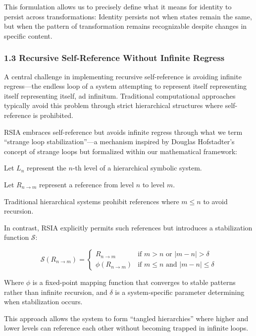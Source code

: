 \documentclass[12pt]{article}
\begin{document}
This formulation allows us to precisely define what it means for
identity to persist across transformations: Identity persists not when
states remain the same, but when the pattern of transformation remains
recognizable despite changes in specific content.

\subsubsection{1.3 Recursive Self-Reference Without Infinite
Regress}\label{recursive-self-reference-without-infinite-regress}

A central challenge in implementing recursive self-reference is avoiding
infinite regress---the endless loop of a system attempting to represent
itself representing itself representing itself, ad infinitum.
Traditional computational approaches typically avoid this problem
through strict hierarchical structures where self-reference is
prohibited.

RSIA embraces self-reference but avoids infinite regress through what we
term ``strange loop stabilization''---a mechanism inspired by Douglas
Hofstadter's concept of strange loops but formalized within our
mathematical framework:

Let \(L_n\) represent the \(n\)-th level of a hierarchical symbolic
system.

Let \(R_{n \rightarrow m}\) represent a reference from level \(n\) to
level \(m\).

Traditional hierarchical systems prohibit references where \(m \leq n\)
to avoid recursion.

In contrast, RSIA explicitly permits such references but introduces a
stabilization function \(\mathcal{S}\):

\[\mathcal{S}(R_{n \rightarrow m}) = \begin{cases} R_{n \rightarrow m} & \text{if } m > n \text{ or } |m - n| > \delta \\ \phi(R_{n \rightarrow m}) & \text{if } m \leq n \text{ and } |m - n| \leq \delta \end{cases}\]

Where \(\phi\) is a fixed-point mapping function that converges to
stable patterns rather than infinite recursion, and \(\delta\) is a
system-specific parameter determining when stabilization occurs.

This approach allows the system to form ``tangled hierarchies'' where
higher and lower levels can reference each other without becoming
trapped in infinite loops.
\end{document}
